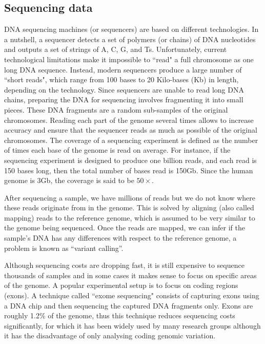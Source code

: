 \subsection{Sequencing data}

DNA sequencing machines (or sequencers) are based on different technologies. In a nutshell, a sequencer detects a set of polymers (or chains) of DNA nucleotides and outputs a set of strings of A, C, G, and Ts. Unfortunately, current technological limitations make it impossible to ``read" a full chromosome as one long DNA sequence. Instead, modern sequencers produce a large number of ``short reads", which range from 100 bases to 20 Kilo-bases (Kb) in length, depending on the technology. Since sequencers are unable to read long DNA chains, preparing the DNA for sequencing involves fragmenting it into small pieces. These DNA fragments are a random sub-samples of the original chromosomes. Reading each part of the genome several times allows to increase accuracy and ensure that the sequencer reads as much as possible of the original chromosomes. The coverage of a sequencing experiment is defined as the number of times each base of the genome is read on average. For instance, if the sequencing experiment is designed to produce one billion reads, and each read is 150 bases long, then the total number of bases read is 150Gb. Since the human genome is 3Gb, the coverage is said to be $50 \times$.

After sequencing a sample, we have millions of reads but we do not know where these reads originate from in the genome. This is solved by aligning (also called mapping) reads to the reference genome, which is assumed to be very similar to the genome being sequenced. Once the reads are mapped, we can infer if the sample's DNA has any differences with respect to the reference genome, a problem is known as ``variant calling''. 

Although sequencing costs are dropping fast, it is still expensive to sequence thousands of samples and in some cases it makes sense to focus on specific areas of the genome. A popular experimental setup is to focus on coding regions (exons). A technique called ``exome sequencing" consists of capturing exons using a DNA chip and then sequencing the captured DNA fragments only. Exons are roughly 1.2\% of the genome, thus this technique reduces sequencing costs significantly, for which it has been widely used by many research groups although it has the disadvantage of only analysing coding genomic variation.

